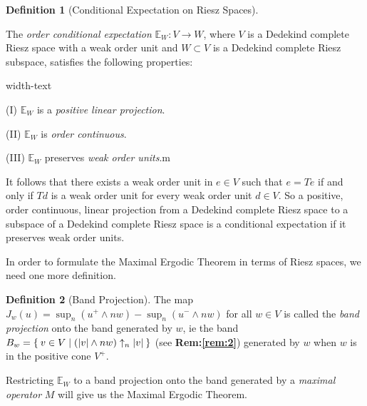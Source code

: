 \documentclass[letterpaper,10pt,oneside,onecolumn,reqno]{amsart}
\newcommand{\E}{\mathbb E}
\theoremstyle{definition}
\newtheorem{defn}{Definition}
\newcommand{\meet}{\wedge}
\begin{document}
\begin{defn}[Conditional Expectation on Riesz Spaces]\label{def:15}

  The \emph{order conditional
    expectation} $\E_W: V \to W$, where $V$ is a Dedekind
  complete Riesz space with a weak order unit and $W \subset V$ is a
  Dedekind complete Riesz subspace, satisfies the following
  properties:

  \begin{deflist}{width-text}
  \item[(I)] $\E_W$ is a \emph{positive linear projection}.
  \item[(II)] $\E_W$ is \emph{order continuous}.
  \item[(III)] $\E_W$ preserves \emph{weak order units}.m
  \end{deflist}
\end{defn}

\begin{framed}
  It follows that there exists a weak order unit in $e \in V$ such
  that $e = Te$ if and only if $Td$ is a weak order unit for every
  weak order unit $d \in V$. So a positive, order continuous, linear
  projection from a Dedekind complete Riesz space to a subspace of a
  Dedekind complete Riesz space is a conditional expectation if it
  preserves weak order units.
\end{framed}

In order to formulate the Maximal Ergodic Theorem in terms of Riesz
spaces, we need one more definition.

\begin{defn}[Band Projection]\label{def:16}
  The map $J_w(u) = \sup_n (u^+ \meet nw) - \sup_n(u^- \meet nw)$ for
  all $w \in V$ is called the \emph{band
    projection} onto the band generated by $w$, ie the band $B_w =
  \Set{v \in V | (|v| \meet nw) \uparrow_n |v|}$ (see
  \textbf{Rem:\ref{rem:2}}) generated by $w$ when $w$ is in the
  positive cone $V^+$.
\end{defn}

Restricting $\E_W$ to a band projection onto the band generated
by a \emph{maximal operator} $M$ will give us
the Maximal Ergodic Theorem.
\end{document}
